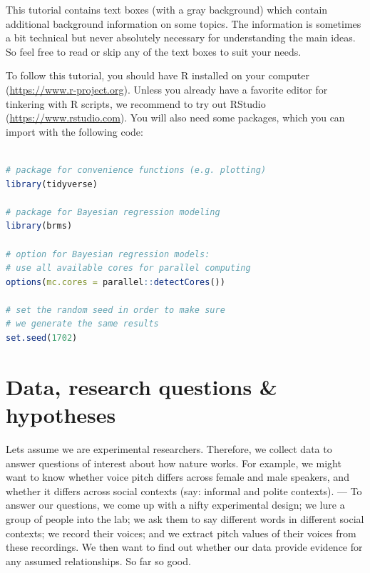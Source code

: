 \documentclass[nobib]{tufte-handout}
\begin{document}
This tutorial contains text boxes (with a gray background) which contain additional background information on some topics.
The information is sometimes a bit technical but never absolutely necessary for understanding the main ideas.
So feel free to read or skip any of the text boxes to suit your needs.

To follow this tutorial, you should have R installed on your computer (\url{https://www.r-project.org}).
Unless you already have a favorite editor for tinkering with R scripts, we recommend to try out RStudio (\url{https://www.rstudio.com}).
You will also need some packages,
which you can import with the following code:

\medskip

\begin{minipage}[]{\textwidth}
\begin{lstlisting}[language=R]

# package for convenience functions (e.g. plotting)
library(tidyverse)

# package for Bayesian regression modeling
library(brms)

# option for Bayesian regression models: 
# use all available cores for parallel computing
options(mc.cores = parallel::detectCores())

# set the random seed in order to make sure 
# we generate the same results
set.seed(1702)
\end{lstlisting}
\end{minipage}

\section{Data, research questions \& hypotheses}
\label{sec:data}

Lets assume we are experimental researchers. Therefore, we collect data to answer questions of interest about how nature works. For example, we might want to know whether voice pitch differs across female and male speakers, and whether it differs across social contexts (say: informal and polite contexts). --- To answer our questions, we come up with a nifty experimental design; we lure a group of people into the lab; we ask them to say different words in different social contexts; we record their voices; and we extract pitch values of their voices from these recordings. We then want to find out whether our data provide evidence for any assumed relationships. So far so good. 
\end{document}
